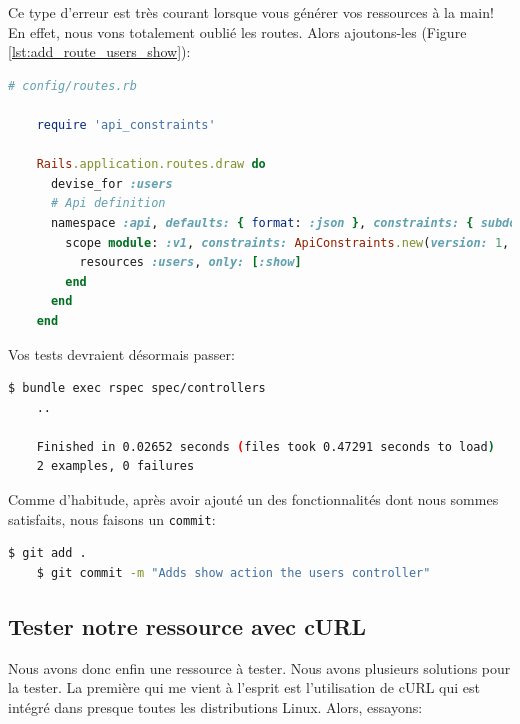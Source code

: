\documentclass[]{report}
\begin{document}
    Ce type d'erreur est très courant lorsque vous générer vos ressources à la main! En effet, nous vons totalement oublié les routes. Alors ajoutons-les (Figure \ref{lst:add_route_users_show}):

    \begin{scriptsize}
    \begin{lstlisting}[language=ruby, caption={Ajoute de la route Users\#Show}, label={lst:add_route_users_show}]
    # config/routes.rb

    require 'api_constraints'

    Rails.application.routes.draw do
      devise_for :users
      # Api definition
      namespace :api, defaults: { format: :json }, constraints: { subdomain: 'api' }, path: '/' do
        scope module: :v1, constraints: ApiConstraints.new(version: 1, default: true) do
          resources :users, only: [:show]
        end
      end
    end
    \end{lstlisting}
    \end{scriptsize}

    Vos tests devraient désormais passer:

    \begin{scriptsize}
    \begin{lstlisting}[language=bash]
    $ bundle exec rspec spec/controllers
    ..

    Finished in 0.02652 seconds (files took 0.47291 seconds to load)
    2 examples, 0 failures
    \end{lstlisting}
    \end{scriptsize}

    Comme d'habitude, après avoir ajouté un des fonctionnalités dont nous sommes satisfaits, nous faisons un \verb|commit|:

    \begin{scriptsize}
    \begin{lstlisting}[language=bash]
    $ git add .
    $ git commit -m "Adds show action the users controller"
    \end{lstlisting}
    \end{scriptsize}

    \subsection{Tester notre ressource avec cURL}

      Nous avons donc enfin une ressource à tester. Nous avons plusieurs solutions pour la tester. La première qui me vient à l'esprit est l'utilisation de cURL qui est intégré dans presque toutes les distributions Linux. Alors, essayons:
\end{document}
